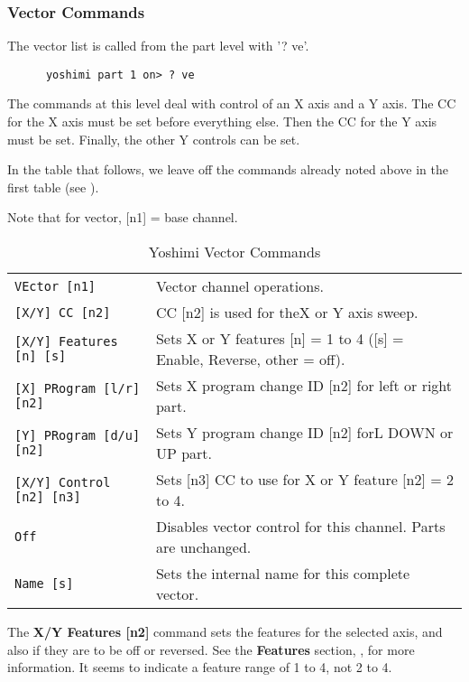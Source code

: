 \subsubsection{Vector Commands}
\label{subsec:command_line_vector_command_list}

   The vector list is called from the part level with '? ve'.

   \begin{verbatim}
      yoshimi part 1 on> ? ve
   \end{verbatim}

   The commands at this level deal with control of an X axis and a Y axis.
   The CC for the X axis must be set before everything else.  Then the CC for
   the Y axis must be set.  Finally, the other Y controls can be set.

   In the table that follows, we leave off the commands already noted
   above in the first table
   (see ).

   Note that for vector, [n1] = base channel.

   \begin{table}[H]
      \centering
      \caption{Yoshimi Vector Commands}
      \label{table:yoshimi_text_vector_commands}
      \begin{tabular}{l l}

\texttt{VEctor [n1]} &
   Vector channel operations. \\
\texttt{[X/Y] CC [n2]} &
   CC [n2] is used for theX or Y axis sweep. \\
\texttt{[X/Y] Features [n] [s]} &
   Sets X or Y features [n] = 1 to 4 ([s] = Enable, Reverse, other = off).  \\
\texttt{[X] PRogram [l/r] [n2]} &
   Sets X program change ID [n2] for left or right part. \\
\texttt{[Y] PRogram [d/u] [n2]} &
   Sets Y program change ID [n2] forL DOWN or UP part. \\
\texttt{[X/Y] Control [n2] [n3]} &
   Sets [n3] CC to use for X or Y feature [n2] = 2 to 4. \\
\texttt{Off} &
   Disables vector control for this channel.  Parts are unchanged. \\
\texttt{Name [s]} &
   Sets the internal name for this complete vector.  \\

      \end{tabular}
   \end{table}

   The \textbf{X/Y Features [n2]} command sets the features for the
   selected axis, and also if they are to be off or reversed.
   See the \textbf{Features} section,
   , for more information.
   It seems to indicate a feature range of 1 to 4, not 2 to 4.

